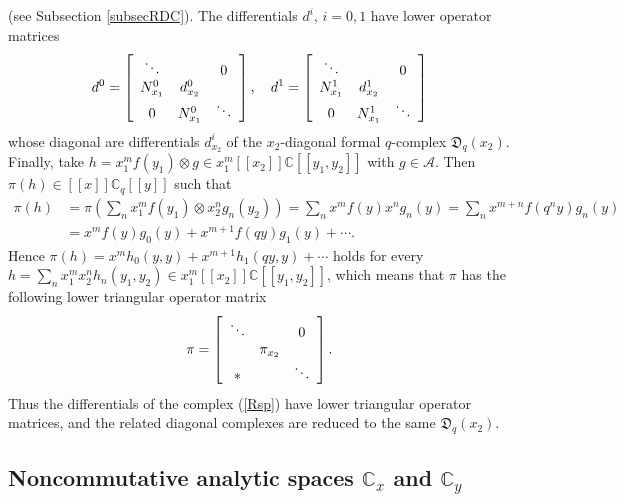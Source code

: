 \documentclass[12pt,reqno]{amsart}%
\theoremstyle{plain}
\numberwithin{theorem}{section} \numberwithin{equation}{section}
\numberwithin{lemma}{section}
\numberwithin{remark}{section}
\numberwithin{example}{section}
\numberwithin{proposition}{section}
\numberwithin{definition}{section}
\numberwithin{corollary}{section}
\begin{document}
(see Subsection \ref{subsecRDC}). The differentials $d^{i}$, $i=0,1$ have
lower operator matrices%
\[
d^{0}=\left[
\begin{array}
[c]{ccc}%
\ddots &  & 0\\
N_{x_{1}}^{0} & d_{x_{2}}^{0} & \\
0 & N_{x_{1}}^{0} & \ddots
\end{array}
\right]  ,\quad d^{1}=\left[
\begin{array}
[c]{ccc}%
\ddots &  & 0\\
N_{x_{1}}^{1} & d_{x_{2}}^{1} & \\
0 & N_{x_{1}}^{1} & \ddots
\end{array}
\right]
\]
whose diagonal are differentials $d_{x_{2}}^{i}$ of the $x_{2}$-diagonal
formal $q$-complex $\mathfrak{D}_{q}\left(  x_{2}\right)  $. Finally, take
$h=x_{1}^{m}f\left(  y_{1}\right)  \otimes g\in x_{1}^{m}\left[  \left[
x_{2}\right]  \right]  \mathbb{C}\left[  \left[  y_{1},y_{2}\right]  \right]
$ with $g\in\mathcal{A}$. Then $\pi\left(  h\right)  \in\left[  \left[
x\right]  \right]  \mathbb{C}_{q}\left[  \left[  y\right]  \right]  $ such
that
\begin{align*}
\pi\left(  h\right)   &  =\pi\left(  \sum_{n}x_{1}^{m}f\left(  y_{1}\right)
\otimes x_{2}^{n}g_{n}\left(  y_{2}\right)  \right)  =\sum_{n}x^{m}f\left(
y\right)  x^{n}g_{n}\left(  y\right)  =\sum_{n}x^{m+n}f\left(  q^{n}y\right)
g_{n}\left(  y\right) \\
&  =x^{m}f\left(  y\right)  g_{0}\left(  y\right)  +x^{m+1}f\left(  qy\right)
g_{1}\left(  y\right)  +\cdots.
\end{align*}
Hence $\pi\left(  h\right)  =x^{m}h_{0}\left(  y,y\right)  +x^{m+1}%
h_{1}\left(  qy,y\right)  +\cdots$ holds for every $h=\sum_{n}x_{1}^{m}%
x_{2}^{n}h_{n}\left(  y_{1},y_{2}\right)  \in x_{1}^{m}\left[  \left[
x_{2}\right]  \right]  \mathbb{C}\left[  \left[  y_{1},y_{2}\right]  \right]
$, which means that $\pi$ has the following lower triangular operator matrix
\[
\pi=\left[
\begin{array}
[c]{ccc}%
\ddots &  & 0\\
& \pi_{x_{2}} & \\
\ast &  & \ddots
\end{array}
\right]  .
\]
Thus the differentials of the complex (\ref{Rsp}) have lower triangular
operator matrices, and the related diagonal complexes are reduced to the same
$\mathfrak{D}_{q}\left(  x_{2}\right)  $.

\subsection{Noncommutative analytic spaces $\mathbb{C}_{x}$ and $\mathbb{C}%
_{y}$\label{subsecHC}}
\end{document}
